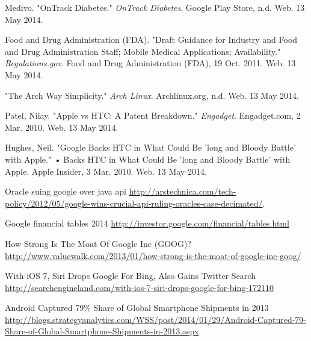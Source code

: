 \documentclass[conference]{IEEEtran}
\begin{document}
\begin{thebibliography}{1}
Medivo. "OnTrack Diabetes." \textit{OnTrack Diabetes}. Google Play Store, n.d. Web. 13 May 2014.

Food and Drug Administration (FDA). "Draft Guidance for Industry and Food and Drug Administration Staff; Mobile Medical Applications; Availability." \textit{Regulations.gov}. Food and Drug Administration (FDA), 19 Oct. 2011. Web. 13 May 2014.

"The Arch Way Simplicity." \textit{Arch Linux}. Archlinux.org, n.d. Web. 13 May 2014.

Patel, Nilay. "Apple vs HTC: A Patent Breakdown." \textit{Engadget}. Engadget.com, 2 Mar. 2010. Web. 13 May 2014.

Hughes, Neil. "Google Backs HTC in What Could Be 'long and Bloody Battle' with Apple." \textit{•} Backs HTC in What Could Be 'long and Bloody Battle' with Apple. Apple Insider, 3 Mar. 2010. Web. 13 May 2014.

Oracle suing google over java api
\url{http://arstechnica.com/tech-policy/2012/05/google-wins-crucial-api-ruling-oracles-case-decimated/}.

Google financial tables 2014
\url{http://investor.google.com/financial/tables.html}

How Strong Is The Moat Of Google Inc (GOOG)?
\url{http://www.valuewalk.com/2013/01/how-strong-is-the-moat-of-google-inc-goog/}

With iOS 7, Siri Drops Google For Bing, Also Gains Twitter Search
\url{http://searchengineland.com/with-ios-7-siri-drops-google-for-bing-172110}

Android Captured 79\% Share of Global Smartphone Shipments in 2013
\url{http://blogs.strategyanalytics.com/WSS/post/2014/01/29/Android-Captured-79-Share-of-Global-Smartphone-Shipments-in-2013.aspx}




\end{thebibliography}
\end{document}
